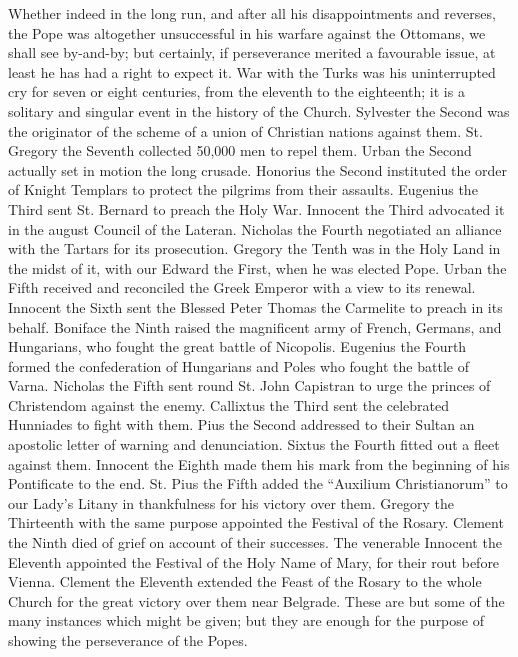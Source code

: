 Whether indeed in the long
run, and after all his disappointments and reverses, the Pope was
altogether unsuccessful in his warfare against the Ottomans, we shall
see by-and-by; but certainly, if perseverance merited a favourable
issue, at least he has had a right to expect it. War with the Turks
was his uninterrupted cry for seven or eight centuries, from the
eleventh to the eighteenth; it is a solitary and singular event in the
history of the Church. Sylvester the Second was the originator
of the scheme of a union of Christian nations against them. St.
Gregory the Seventh collected 50,000 men to repel them. Urban the
Second actually set in motion the long crusade. Honorius the Second
instituted the order of Knight Templars to protect the pilgrims from
their assaults. Eugenius the Third sent St. Bernard to preach the Holy
War. Innocent the Third advocated it in the august Council of the
Lateran. Nicholas the Fourth negotiated an alliance with the Tartars
for its prosecution. Gregory the Tenth was in the Holy Land in the
midst of it, with our Edward the First, when he was elected Pope.
Urban the Fifth received and reconciled the Greek Emperor with a view
to its renewal. Innocent the Sixth sent the Blessed Peter Thomas the
Carmelite to preach in its behalf. Boniface the Ninth raised the
magnificent army of French, Germans, and Hungarians, who fought the
great battle of Nicopolis. Eugenius the Fourth formed the
confederation of Hungarians and Poles who fought the battle of Varna.
Nicholas the Fifth sent round St. John Capistran to urge the princes
of Christendom against the enemy. Callixtus the Third sent the
celebrated Hunniades to fight with them. Pius the Second addressed to
their Sultan an apostolic letter of warning and denunciation. Sixtus
the Fourth fitted out a fleet against them. Innocent the Eighth made
them his mark from the beginning of his Pontificate to the end. St.
Pius the Fifth added the ``Auxilium Christianorum'' to our Lady's Litany
in thankfulness for his victory over them. Gregory the Thirteenth with
the same purpose appointed the Festival of the Rosary. Clement the
Ninth died of grief on account of their successes. The venerable
Innocent the Eleventh appointed the Festival of the Holy Name of Mary,
for their rout before Vienna. Clement the Eleventh extended the
Feast of the Rosary to the whole Church for the great victory over
them near Belgrade. These are but some of the many instances which
might be given; but they are enough for the purpose of showing the
perseverance of the Popes.

